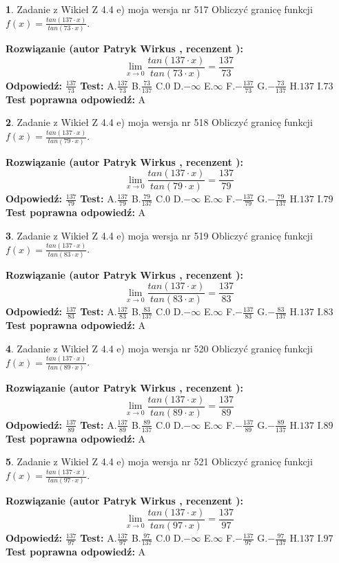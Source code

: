 \documentclass[12pt, a4paper]{article}
\theoremstyle{definition} %
\newtheorem{zad}{}
\newcommand{\zadStart}[1]{\begin{zad}#1\newline}
\newcommand{\zadStop}{\end{zad}}
\newcommand{\rozwStart}[2]{\noindent \textbf{Rozwiązanie (autor #1 , recenzent #2): }\newline}
\newcommand{\rozwStop}{\newline}
\newcommand{\odpStart}{\noindent \textbf{Odpowiedź:}\newline}
\newcommand{\odpStop}{\newline}
\newcommand{\testStart}{\noindent \textbf{Test:}\newline}
\newcommand{\testStop}{\newline}
\newcommand{\kluczStart}{\noindent \textbf{Test poprawna odpowiedź:}\newline}
\newcommand{\kluczStop}{\newline}
\begin{document}
\zadStart{Zadanie z Wikieł Z 4.4 e) moja wersja nr 517}
Obliczyć granicę funkcji $f(x)=\frac{tan(137\cdot x)}{tan(73\cdot x)}$.
\zadStop
\rozwStart{Patryk Wirkus}{}
$$\lim\limits_{x\to 0}\frac{tan(137\cdot x)}{tan(73\cdot x)}=
\frac{137}{73}$$
\rozwStop
\odpStart
$\frac{137}{73}$
\odpStop
\testStart
A.$\frac{137}{73}$
B.$\frac{73}{137}$
C.$0$
D.$-\infty$
E.$\infty$
F.$-\frac{137}{73}$
G.$-\frac{73}{137}$
H.$137$
I.$73$
\testStop
\kluczStart
A
\kluczStop



\zadStart{Zadanie z Wikieł Z 4.4 e) moja wersja nr 518}
Obliczyć granicę funkcji $f(x)=\frac{tan(137\cdot x)}{tan(79\cdot x)}$.
\zadStop
\rozwStart{Patryk Wirkus}{}
$$\lim\limits_{x\to 0}\frac{tan(137\cdot x)}{tan(79\cdot x)}=
\frac{137}{79}$$
\rozwStop
\odpStart
$\frac{137}{79}$
\odpStop
\testStart
A.$\frac{137}{79}$
B.$\frac{79}{137}$
C.$0$
D.$-\infty$
E.$\infty$
F.$-\frac{137}{79}$
G.$-\frac{79}{137}$
H.$137$
I.$79$
\testStop
\kluczStart
A
\kluczStop



\zadStart{Zadanie z Wikieł Z 4.4 e) moja wersja nr 519}
Obliczyć granicę funkcji $f(x)=\frac{tan(137\cdot x)}{tan(83\cdot x)}$.
\zadStop
\rozwStart{Patryk Wirkus}{}
$$\lim\limits_{x\to 0}\frac{tan(137\cdot x)}{tan(83\cdot x)}=
\frac{137}{83}$$
\rozwStop
\odpStart
$\frac{137}{83}$
\odpStop
\testStart
A.$\frac{137}{83}$
B.$\frac{83}{137}$
C.$0$
D.$-\infty$
E.$\infty$
F.$-\frac{137}{83}$
G.$-\frac{83}{137}$
H.$137$
I.$83$
\testStop
\kluczStart
A
\kluczStop



\zadStart{Zadanie z Wikieł Z 4.4 e) moja wersja nr 520}
Obliczyć granicę funkcji $f(x)=\frac{tan(137\cdot x)}{tan(89\cdot x)}$.
\zadStop
\rozwStart{Patryk Wirkus}{}
$$\lim\limits_{x\to 0}\frac{tan(137\cdot x)}{tan(89\cdot x)}=
\frac{137}{89}$$
\rozwStop
\odpStart
$\frac{137}{89}$
\odpStop
\testStart
A.$\frac{137}{89}$
B.$\frac{89}{137}$
C.$0$
D.$-\infty$
E.$\infty$
F.$-\frac{137}{89}$
G.$-\frac{89}{137}$
H.$137$
I.$89$
\testStop
\kluczStart
A
\kluczStop



\zadStart{Zadanie z Wikieł Z 4.4 e) moja wersja nr 521}
Obliczyć granicę funkcji $f(x)=\frac{tan(137\cdot x)}{tan(97\cdot x)}$.
\zadStop
\rozwStart{Patryk Wirkus}{}
$$\lim\limits_{x\to 0}\frac{tan(137\cdot x)}{tan(97\cdot x)}=
\frac{137}{97}$$
\rozwStop
\odpStart
$\frac{137}{97}$
\odpStop
\testStart
A.$\frac{137}{97}$
B.$\frac{97}{137}$
C.$0$
D.$-\infty$
E.$\infty$
F.$-\frac{137}{97}$
G.$-\frac{97}{137}$
H.$137$
I.$97$
\testStop
\kluczStart
A
\kluczStop
\end{document}
